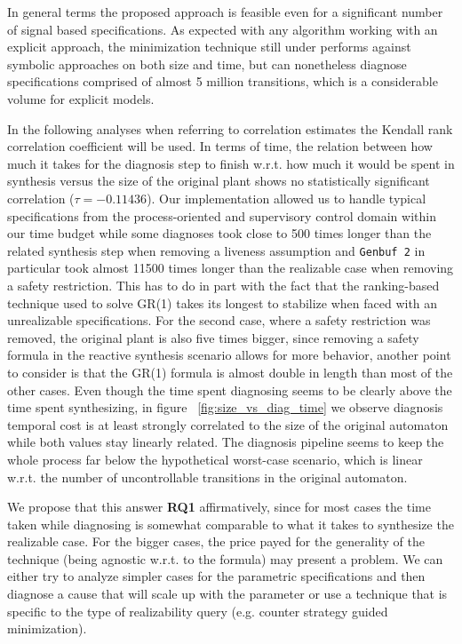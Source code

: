 In general terms the proposed approach is feasible even for a significant number of signal based specifications. 
As expected with any algorithm working with an explicit approach, the minimization technique still under performs against symbolic approaches on both size and time, but can nonetheless diagnose specifications comprised of almost 5 million transitions, which is a considerable volume for explicit models.  

In the following analyses when referring to correlation estimates the Kendall rank correlation coefficient will be used. 
In terms of time, the relation between how much it takes for the diagnosis step to finish  w.r.t. how much it would be spent in synthesis versus the size of the original plant shows no statistically significant correlation ($\tau=-0.11436$). Our implementation allowed us to handle typical specifications from the process-oriented and supervisory control domain within our time budget while some diagnoses took close to 500 times longer than the related synthesis step when removing a liveness assumption and \texttt{Genbuf 2} in particular took almost 11500 times longer than the realizable case when removing a safety restriction. This has to do in part with the fact that the ranking-based technique used to solve GR(1) takes its longest to stabilize when faced with an unrealizable specifications. For the second case, where a safety restriction was removed, the original plant is also five times bigger, since removing a safety formula in the reactive synthesis scenario allows for more behavior, another point to consider is that the GR(1) formula is almost double in length than most of the other cases. 
Even though the time spent diagnosing seems to be clearly above the time spent synthesizing, in figure ~\ref{fig:size_vs_diag_time} we observe diagnosis temporal cost is at least strongly correlated to the size of the original automaton while both values stay linearly related. 
The diagnosis pipeline seems to keep the whole process far below the hypothetical worst-case scenario, which is linear w.r.t. the number of uncontrollable transitions in the original automaton.  

We propose that this answer \textbf{RQ1} affirmatively, since for most cases the time taken while diagnosing is somewhat comparable to what it takes to synthesize the realizable case. For the bigger cases, the price payed for the generality of the technique (being agnostic w.r.t. to the formula) may present a problem. We can either try to analyze simpler cases for the parametric specifications and then diagnose a cause that will scale up with the parameter or use a technique that is specific to the type of realizability query (e.g. counter strategy guided minimization). 

